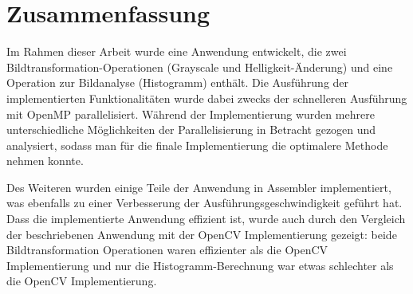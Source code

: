 \documentclass[11pt]{amsart}
\begin{document}
\section{Zusammenfassung}


Im Rahmen dieser Arbeit wurde eine Anwendung entwickelt, die zwei Bildtransformation-Operationen (Grayscale und Helligkeit-Änderung) und eine Operation zur Bildanalyse (Histogramm) enthält. Die Ausführung der implementierten Funktionalitäten wurde dabei zwecks der schnelleren Ausführung mit OpenMP parallelisiert. Während der Implementierung wurden mehrere unterschiedliche Möglichkeiten der Parallelisierung in Betracht gezogen und analysiert, sodass man für die finale Implementierung die optimalere Methode nehmen konnte.

 Des Weiteren wurden einige Teile der Anwendung in Assembler implementiert, was ebenfalls zu einer Verbesserung der Ausführungsgeschwindigkeit geführt hat. Dass die implementierte Anwendung effizient ist, wurde auch durch den Vergleich der beschriebenen Anwendung mit der OpenCV Implementierung gezeigt: beide Bildtransformation Operationen waren effizienter als die OpenCV Implementierung und nur die Histogramm-Berechnung war etwas schlechter als die OpenCV Implementierung. 
\end{document}
